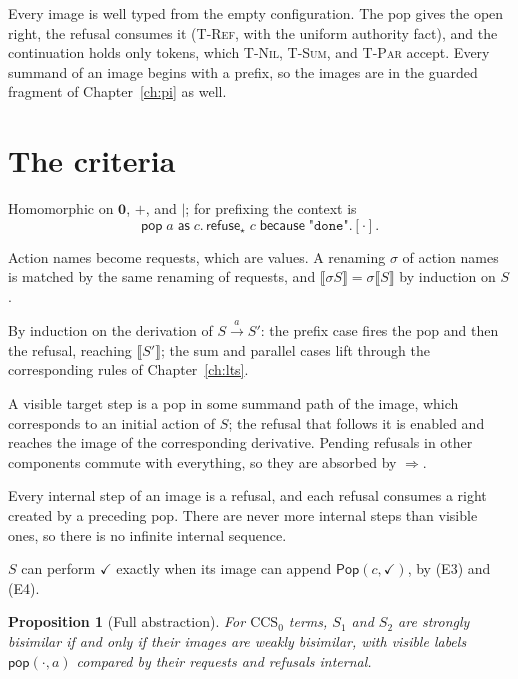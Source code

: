\documentclass[11pt,openany]{book}
\newtheorem{proposition}[theorem]{Proposition}
\theoremstyle{remark}
\newcommand{\Pop}{\mathsf{Pop}}
\begin{document}
Every image is well typed from the empty configuration. The pop gives the
open right, the refusal consumes it (\textsc{T-Ref}, with the uniform
authority fact), and the continuation holds only tokens, which
\textsc{T-Nil}, \textsc{T-Sum}, and \textsc{T-Par} accept. Every summand
of an image begins with a prefix, so the images are in the guarded
fragment of Chapter~\ref{ch:pi} as well.

\section{The criteria}

\begin{description}[leftmargin=1.5em,style=nextline]
\item[(E1) Compositionality.] Homomorphic on $\mathbf 0$, $+$, and
$\mid$; for prefixing the context is
\[
\mathsf{pop}\;a\;\mathsf{as}\;c.\,\mathsf{refuse}_\star\;c\;\mathsf{because}\;\texttt{"done"}.[\cdot].
\]
\item[(E2) Name invariance.] Action names become requests, which are
values. A renaming $\sigma$ of action names is matched by the same
renaming of requests, and $\llbracket\sigma S\rrbracket=\sigma\llbracket
S\rrbracket$ by induction on $S$.
\item[(E3) Completeness.] By induction on the derivation of
$S\xrightarrow{a}S'$: the prefix case fires the pop and then the refusal,
reaching $\llbracket S'\rrbracket$; the sum and parallel cases lift
through the corresponding rules of Chapter~\ref{ch:lts}.
\item[(E4) Soundness.] A visible target step is a pop in some summand
path of the image, which corresponds to an initial action of $S$; the
refusal that follows it is enabled and reaches the image of the
corresponding derivative. Pending refusals in other components commute
with everything, so they are absorbed by $\Rightarrow$.
\item[(E5) Divergence reflection.] Every internal step of an image is a
refusal, and each refusal consumes a right created by a preceding pop.
There are never more internal steps than visible ones, so there is no
infinite internal sequence.
\item[(E6) Success sensitiveness.] $S$ can perform $\checkmark$ exactly
when its image can append $\Pop(c,\checkmark)$, by (E3) and (E4).
\end{description}

\begin{proposition}[Full abstraction]\label{prop:workedfa}
For $\mathrm{CCS}_0$ terms, $S_1$ and $S_2$ are strongly bisimilar if and
only if their images are weakly bisimilar, with visible labels
$\mathsf{pop}(\cdot,a)$ compared by their requests and refusals internal.
\end{proposition}
\end{document}
